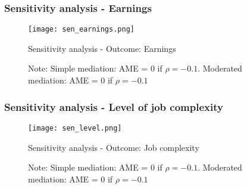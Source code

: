 \documentclass{beamer}
\begin{document}

\begin{frame}
\frametitle{Sensitivity analysis - Earnings}
\begin{figure}
\centering
\texttt{[image: sen\_earnings.png]}
  \caption{Sensitivity analysis - Outcome: Earnings}
\caption*{\small{Note: Simple mediation: AME = 0 if $\rho = -0.1$. Moderated mediation: AME = 0 if $\rho = -0.1$}}
\end{figure}
\end{frame}

\begin{frame}
\frametitle{Sensitivity analysis - Level of job complexity}
\begin{figure}
\centering
\texttt{[image: sen\_level.png]}
  \caption{Sensitivity analysis - Outcome: Job complexity}
\caption*{\small{Note: Simple mediation: AME = 0 if $\rho = -0.1$. Moderated mediation: AME = 0 if $\rho = -0.1 $}}
\end{figure}
\end{frame}
\end{document}
